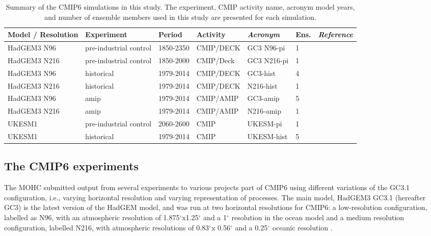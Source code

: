 \begin{table}
\small
\caption{Summary of the CMIP6 simulations in this study. The experiment, CMIP activity name, acronym model years, and number of ensemble members used in this study are presented for each simulation.}
\begin{tabular}{p{}|p{2.3cm}p{1.7cm}p{}p{}p{0.9cm}p{}} \label{tab:Sexps} \small
 Model / Resolution & Experiment & Period & Activity & \textit{Acronym}  & Ens. & \textit{Reference}                 \\ \hline \hline

HadGEM3 N96    &  pre-industrial control  & 1850-2350 & CMIP/DECK & GC3 N96-pi      & 1 &   \citep{menary2018,gc3pi}                          \\
HadGEM3 N216  &  pre-industrial control & 1850-2000        & CMIP/Deck & GC3 N216-pi   & 1 & \citep{menary2018,n216pi}      \\
HadGEM3 N96    &  historical & 1979-2014       & CMIP/DECK & GC3-hist     &  4 & \citep{andrews2020,gc3hist}                          \\
HadGEM3 N216   &  historical & 1979-2014        & CMIP/DECK & N216-hist   & 1 & \citep{n216pi}      \\
HadGEM3 N96   & amip  & 1979-2014 & CMIP/AMIP  & GC3-amip   & 5  &   \citep{gc3amip}                          \\
HadGEM3 N216   & amip  & 1979-2014 & CMIP/AMIP  & N216-amip   & 1  &   \citep{gc3amip}                          \\
UKESM1   &  pre-industrial control  & 2060-2600       & CMIP & UKESM-pi      & 1 & \citep{ukesmpi}            \\
UKESM1   &  historical  & 1979-2014       & CMIP & UKESM-hist & 5     &  \citep{ukesmhist}            \\
\end{tabular}
\end{table}

\subsection{The CMIP6 experiments}\label{sq:cmip6exp}

The MOHC submitted output from several experiments to various projects part of CMIP6 using different variations of the GC3.1 configuration, i.e., varying horizontal resolution and varying representation of processes. 
The main model, HadGEM3 GC3.1 (hereafter GC3) is the latest version of the HadGEM model, and was run at two horizontal resolutions for CMIP6: a low-resolution configuration, labelled as N96, with an atmospheric resolution of 1.875$^\circ$x1.25$^\circ$ and a 1$^\circ$ resolution in the ocean model and a medium resolution configuration, labelled N216, with atmospheric resolutions of 0.83$^\circ$x 0.56$^\circ$ and a 0.25$^\circ$ oceanic resolution \citep{menary2018}. 

